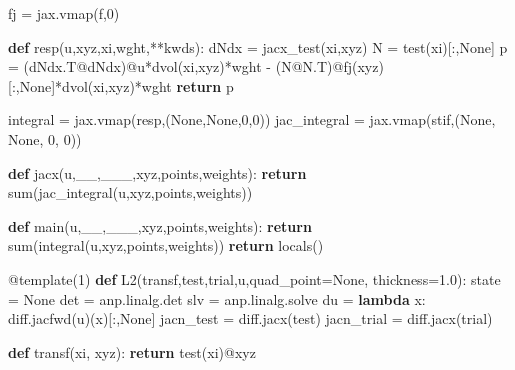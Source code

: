 \documentclass[
  11pt,
]{article}
\newenvironment{Shaded}{}{}
\newcommand{\AttributeTok}[1]{\textcolor[rgb]{0.49,0.56,0.16}{#1}}
\newcommand{\BuiltInTok}[1]{#1}
\newcommand{\ControlFlowTok}[1]{\textcolor[rgb]{0.00,0.44,0.13}{\textbf{#1}}}
\newcommand{\DecValTok}[1]{\textcolor[rgb]{0.25,0.63,0.44}{#1}}
\newcommand{\FloatTok}[1]{\textcolor[rgb]{0.25,0.63,0.44}{#1}}
\newcommand{\KeywordTok}[1]{\textcolor[rgb]{0.00,0.44,0.13}{\textbf{#1}}}
\newcommand{\NormalTok}[1]{#1}
\newcommand{\OperatorTok}[1]{\textcolor[rgb]{0.40,0.40,0.40}{#1}}
\newcommand{\VariableTok}[1]{\textcolor[rgb]{0.10,0.09,0.49}{#1}}
\begin{document}
\begin{Shaded}
\begin{Highlighting}[]
\NormalTok{    fj }\OperatorTok{=}\NormalTok{ jax.vmap(f,}\DecValTok{0}\NormalTok{)}
    
    \KeywordTok{def}\NormalTok{ resp(u,xyz,xi,wght,}\OperatorTok{**}\NormalTok{kwds):}
\NormalTok{        dNdx }\OperatorTok{=}\NormalTok{ jacx\_test(xi,xyz)}
\NormalTok{        N }\OperatorTok{=}\NormalTok{ test(xi)[:,}\VariableTok{None}\NormalTok{]}
\NormalTok{        p }\OperatorTok{=}\NormalTok{ (dNdx.T}\OperatorTok{@}\NormalTok{dNdx)}\OperatorTok{@}\NormalTok{u}\OperatorTok{*}\NormalTok{dvol(xi,xyz)}\OperatorTok{*}\NormalTok{wght }\OperatorTok{{-}}\NormalTok{ (N}\OperatorTok{@}\NormalTok{N.T)}\OperatorTok{@}\NormalTok{fj(xyz)[:,}\VariableTok{None}\NormalTok{]}\OperatorTok{*}\NormalTok{dvol(xi,xyz)}\OperatorTok{*}\NormalTok{wght}
        \ControlFlowTok{return}\NormalTok{ p}
    
\NormalTok{    integral }\OperatorTok{=}\NormalTok{ jax.vmap(resp,(}\VariableTok{None}\NormalTok{,}\VariableTok{None}\NormalTok{,}\DecValTok{0}\NormalTok{,}\DecValTok{0}\NormalTok{))}
\NormalTok{    jac\_integral }\OperatorTok{=}\NormalTok{ jax.vmap(stif,(}\VariableTok{None}\NormalTok{, }\VariableTok{None}\NormalTok{, }\DecValTok{0}\NormalTok{, }\DecValTok{0}\NormalTok{))}
    
    \KeywordTok{def}\NormalTok{ jacx(u,\_\_,\_\_\_,xyz,points,weights):}
        \ControlFlowTok{return} \BuiltInTok{sum}\NormalTok{(jac\_integral(u,xyz,points,weights))}

    \KeywordTok{def}\NormalTok{ main(u,\_\_,\_\_\_,xyz,points,weights):}
        \ControlFlowTok{return} \BuiltInTok{sum}\NormalTok{(integral(u,xyz,points,weights))}
    \ControlFlowTok{return} \BuiltInTok{locals}\NormalTok{()}

\AttributeTok{@template}\NormalTok{(}\DecValTok{1}\NormalTok{)}
\KeywordTok{def}\NormalTok{ L2(transf,test,trial,u,quad\_point}\OperatorTok{=}\VariableTok{None}\NormalTok{, thickness}\OperatorTok{=}\FloatTok{1.0}\NormalTok{):}
\NormalTok{    state }\OperatorTok{=} \VariableTok{None}
\NormalTok{    det }\OperatorTok{=}\NormalTok{ anp.linalg.det}
\NormalTok{    slv }\OperatorTok{=}\NormalTok{ anp.linalg.solve}
\NormalTok{    du }\OperatorTok{=} \KeywordTok{lambda}\NormalTok{ x: diff.jacfwd(u)(x)[:,}\VariableTok{None}\NormalTok{]}
\NormalTok{    jacn\_test }\OperatorTok{=}\NormalTok{ diff.jacx(test)}
\NormalTok{    jacn\_trial }\OperatorTok{=}\NormalTok{ diff.jacx(trial)}

    \KeywordTok{def}\NormalTok{ transf(xi, xyz):}
        \ControlFlowTok{return}\NormalTok{ test(xi)}\OperatorTok{@}\NormalTok{xyz}
    

\end{Highlighting}
\end{Shaded}
\end{document}
